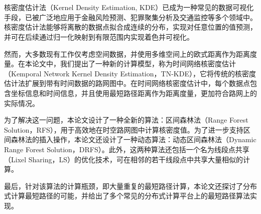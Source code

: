 \vspace{-2.5cm}
\chapter*{\xiaosan {}}
\hspace{-0.5cm}

核密度估计法（Kernel Density Estimation, KDE）已成为一种常见的数据可视化手段，已被广泛地应用于金融风险预测、犯罪聚集分析及交通监控等多个领域中。核密度估计法能够将离散的数据点拟合成连续的分布，实现对任意位置的值预测，并可在后续通过归一化映射到有限范围内实现着色并可视化。

然而，大多数现有工作仅考虑空间数据，并使用多维空间上的欧式距离作为距离度量。在本论文中，我们提出了一种新的计算模型，称为时间网络核密度估计（Kemporal Network Kernel Density Estimation，TN-KDE），它将传统的核密度估计法扩展到带有时间数据的路网图中。在时间网络核密度估计中，每个数据点包含坐标信息和时间信息，并且使用最短路径距离作为距离度量，更加符合路网上的实际情况。

为了解决这一问题，本论文设计了一种全新的算法：区间森林法（Range Forest Solution，RFS），用于高效地在时空路网图中计算核密度值。为了进一步支持区间森林法的插入操作，本论文还设计了一种动态算法：动态区间森林法（Dynamic Range Forest Solution，DRFS）。此外，这两种算法还包括一个名为线段点共享（Lixel Sharing，LS）的优化技术，可在相邻的若干线段点中共享大量相似的计算。

最后，针对该算法的计算瓶颈，即大量重复的最短路径计算，本论文还探讨了分布式计算最短路径的可能，并给出了多个常见的分布式计算平台上的最短路径算法实现。


 